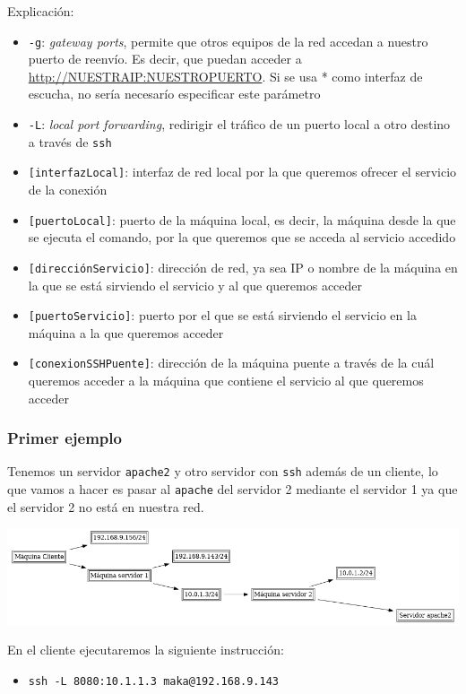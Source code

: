 \documentclass[11pt]{article}
\begin{document}
Explicación:
\begin{itemize}
\item \texttt{-g}: \emph{gateway ports}, permite que otros equipos de la red accedan a nuestro puerto de reenvío. Es decir, que puedan acceder a \url{http://NUESTRAIP:NUESTROPUERTO}. Si se usa * como interfaz de
escucha, no sería necesarío especificar este parámetro
\item \texttt{-L}: \emph{local port forwarding}, redirigir el tráfico de un puerto local a otro destino a través de \texttt{ssh}
\item \texttt{[interfazLocal]}: interfaz de red local por la que queremos ofrecer el servicio de la conexión
\item \texttt{[puertoLocal]}: puerto de la máquina local, es decir, la máquina desde la que se ejecuta el comando, por la que queremos que se acceda al servicio accedido
\item \texttt{[direcciónServicio]}: dirección de red, ya sea IP o nombre de la máquina en la que se está sirviendo el servicio y al que queremos acceder
\item \texttt{[puertoServicio]}: puerto por el que se está sirviendo el servicio en la máquina a la que queremos acceder
\item \texttt{[conexionSSHPuente]}: dirección de la máquina puente a través de la cuál queremos acceder a la máquina que contiene el servicio al que queremos acceder
\end{itemize}


\subsubsection{Primer ejemplo}
\label{sec:orgfbdc165}
Tenemos un servidor \texttt{apache2} y otro servidor con \texttt{ssh} además de un cliente, lo que vamos a hacer es pasar al \texttt{apache} del servidor 2 mediante el servidor 1 ya que el servidor 2 no está en
nuestra red.

\begin{center}
\includegraphics[width=.9\linewidth]{./esquema-ejemplo-uno_diagram.png}
\end{center}

En el cliente ejecutaremos la siguiente instrucción:
\begin{itemize}
\item \texttt{ssh -L 8080:10.1.1.3 maka@192.168.9.143}
\end{itemize}
\end{document}

